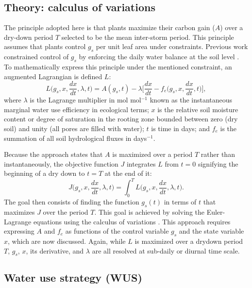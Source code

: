 \documentclass[utf8]{frontiersSCNS} %
\begin{document}
\subsection{Theory: calculus of variations}

The principle adopted here is that plants maximize their carbon gain ($A$) over a dry-down period $T$ selected to be the mean inter-storm period. This principle assumes that plants control $g_s$ per unit leaf area under constraints. Previous work constrained control of $g_s$ by enforcing the daily water balance at the soil level \citep{manzoni_optimization_2013}. To mathematically express this principle under the mentioned constraint, an augmented Lagrangian is defined $L$:
\begin{equation}
    \label{eqn:Lagrangian}
    L\Big(g_s, x, \frac{dx}{dt}, \lambda, t\Big) = A(g_s, t) - \lambda \Bigg[ \frac{dx}{dt} - f_e\Big(g_s, x, \frac{dx}{dt}, t\Big)\Bigg],
\end{equation}
where $\lambda$ is the Lagrange multiplier in mol mol$^{-1}$ known as the instantaneous marginal water use efficiency in ecological terms; $x$ is the relative soil moisture content or degree of saturation in the rooting zone bounded between zero (dry soil) and unity (all pores are filled with water); $t$ is time in days; and $f_e$ is the summation of all soil hydrological fluxes in days$^{-1}$.

Because the approach states that $A$ is maximized over a period $T$ rather than instantaneously, the objective function $J$ integrates $L$ from $t=0$ signifying the beginning of a dry down to $t=T$ at the end of it:
\begin{equation}
    \label{eqn:Objective}
    J\Big(g_s, x, \frac{dx}{dt}, \lambda, t\Big) = \int_0^T L\Big(g_s, x, \frac{dx}{dt}, \lambda, t\Big).
\end{equation}
The goal then consists of finding the function $g_s(t)$ in terms of $t$ that maximizes $J$ over the period $T$. This goal is achieved by solving the Euler-Lagrange equations using the calculus of variations \citep{witelski_variational_2015}. This approach requires expressing $A$ and $f_e$ as functions of the control variable $g_s$ and the state variable $x$, which are now discussed. Again, while $L$ is maximized over a drydown period $T$, $g_s$, $x$, its derivative, and $\lambda$ are all resolved at sub-daily or diurnal time scale.

\subsection{Water use strategy (WUS)}
\end{document}
